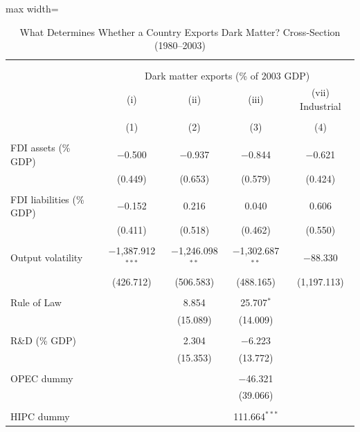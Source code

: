 \documentclass[11pt]{article}
\begin{document}
\small
\setcounter{table}{2}

\begin{table}[!htbp] \centering 
  \caption{What Determines Whether a Country Exports Dark Matter? Cross-Section (1980--2003)} 
  \label{tab:table3} 
\begin{adjustbox}{max width=\linewidth}
\begin{tabular}{@{\extracolsep{5pt}}lcccc} 
\\[-1.8ex]\hline 
\hline \\[-1.8ex] 
\\[-1.8ex] & \multicolumn{4}{c}{Dark matter exports (\% of 2003 GDP)} \\ 
 & (i) & (ii) & (iii) & (vii) Industrial \\ 
\\[-1.8ex] & (1) & (2) & (3) & (4)\\ 
\hline \\[-1.8ex] 
 FDI assets (\% GDP) & $-$0.500 & $-$0.937 & $-$0.844 & $-$0.621 \\ 
  & (0.449) & (0.653) & (0.579) & (0.424) \\ 
  & & & & \\ 
 FDI liabilities (\% GDP) & $-$0.152 & 0.216 & 0.040 & 0.606 \\ 
  & (0.411) & (0.518) & (0.462) & (0.550) \\ 
  & & & & \\ 
 Output volatility & $-$1,387.912$^{***}$ & $-$1,246.098$^{**}$ & $-$1,302.687$^{**}$ & $-$88.330 \\ 
  & (426.712) & (506.583) & (488.165) & (1,197.113) \\ 
  & & & & \\ 
 Rule of Law &  & 8.854 & 25.707$^{*}$ &  \\ 
  &  & (15.089) & (14.009) &  \\ 
  & & & & \\ 
 R\&D (\% GDP) &  & 2.304 & $-$6.223 &  \\ 
  &  & (15.353) & (13.772) &  \\ 
  & & & & \\ 
 OPEC dummy &  &  & $-$46.321 &  \\ 
  &  &  & (39.066) &  \\ 
  & & & & \\ 
 HIPC dummy &  &  & 111.664$^{***}$ &  \\ 

\end{tabular}
\end{adjustbox}
\end{table}
\end{document}
